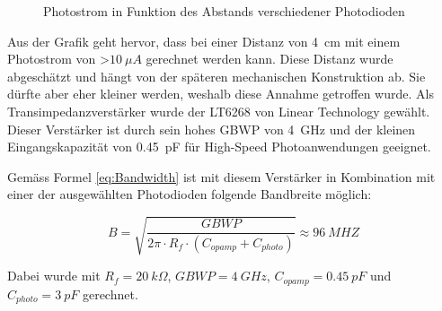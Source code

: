 \begin{figure}[h]
\centering
{}
\caption{Photostrom in Funktion des Abstands verschiedener Photodioden}\label{fig:Plot_Photo}
\end{figure}

Aus der Grafik geht hervor, dass bei einer Distanz von \SI{4}{cm} mit einem Photostrom von \textgreater $\SI{10}{\mu A}$ gerechnet werden kann. Diese Distanz wurde abgeschätzt und hängt von der späteren mechanischen Konstruktion ab. Sie dürfte aber eher kleiner werden, weshalb diese Annahme getroffen wurde.
\newline
Als Transimpedanzverstärker wurde der LT6268 von Linear Technology gewählt. Dieser Verstärker ist durch sein hohes GBWP von \SI{4}{GHz} und der kleinen Eingangskapazität von \SI{0.45}{pF} für High-Speed Photoanwendungen geeignet.

Gemäss Formel \ref{eq:Bandwidth} ist mit diesem Verstärker in Kombination mit einer der ausgewählten Photodioden folgende Bandbreite möglich:

\begin{equation}\label{eq:Bandwidth2}
B=\sqrt{\frac{GBWP}{2\pi\cdot R_{f}\cdot (C_{opamp}+C_{photo})}}\approx \SI{96}{MHZ}
\end{equation}

Dabei wurde mit $R_{f}=\SI{20}{k\Omega}$, $GBWP=\SI{4}{GHz}$, $C_{opamp}=\SI{0.45}{pF}$ und $C_{photo}=\SI{3}{pF}$ gerechnet.

